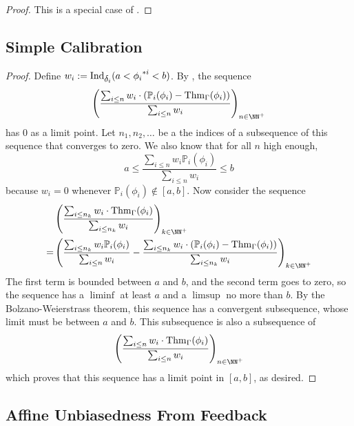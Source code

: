 \documentclass[authordate,onecolumn,noenvironments]{miri-tech-article}
\numberwithin{equation}{subsection}
\newcommand{\nn}{n}
\newcommand{\fuz}{w}
\newcommand{\BelState}{\mathbb{P}}
\newcommand{\pf}[2][\nn]{{#2}^{*#1}}
\newcommand{\pt}{\BelState}
\newcommand{\Theory}{\Gamma}
\newcommand{\ctsind}[1]{\operatorname{Ind}_{\text{\small{${#1}$}}}} %
\newcommand{\thmind}[1][\Theory]{\operatorname{Thm}_{#1}\-} %
\begin{document}
\recurringunbiasedness*

\begin{proof}
  This is a special case of .
\end{proof}

\subsection{Simple Calibration}\label{app:simcal}

\simcal*
\begin{proof}
Define $\fuz_i := \ctsind{\delta_i}(a < \pf[i]{\phi_i} < b) $.  By , the sequence
 \[
   \left( \frac
      {\sum_{i\leq \nn}\fuz_i\cdot (\pt_i(\phi_i) - \thmind(\phi_i))}
        {\sum_{i\leq \nn}\fuz_i}
      \right)_{n \in \NN^+}
  \]
  has 0 as a limit point.  Let $n_1, n_2, \ldots$ be a the indices of a subsequence of this sequence that converges to zero.  We also know that for all $n$ high enough,
 \[
      a \leq \frac {\sum_{i\leq \nn}\fuz_i \pt_i(\phi_i)}{\sum_{i\leq \nn}\fuz_i} \leq b
  \]
  because $\fuz_i = 0$ whenever $\pt_i(\phi_i) \not\in [a, b]$. Now consider the sequence
  \begin{align*}
    & \left(\frac
      {\sum_{i\leq \nn_k}\fuz_i\cdot \thmind(\phi_i)}
        {\sum_{i\leq \nn_k}\fuz_i}
      \right)_{k \in \NN^+}
      \\
      = &
        \left(
      \frac {\sum_{i\leq \nn_k}\fuz_i \pt_i(\phi_i)}{\sum_{i\leq \nn}\fuz_i}
      -
      \frac{\sum_{i\leq \nn_k}\fuz_i\cdot (\pt_i(\phi_i) - \thmind(\phi_i))}
        {\sum_{i\leq \nn_k}\fuz_i}
      \right)_{k \in \NN^+}
    \end{align*}
      The first term is bounded between $a$ and $b$, and the second term goes to zero, so the sequence has a
      $\liminf$ at least $a$ and a $\limsup$ no more than $b$.  By the Bolzano-Weierstrass theorem,
      this sequence has a convergent subsequence, whose limit must be between $a$ and $b$.
      This subsequence is also a subsequence of
      \[
      \left(\frac
        {\sum_{i\leq \nn}\fuz_i\cdot \thmind(\phi_i)}
          {\sum_{i\leq \nn}\fuz_i}
        \right)_{n \in \NN^+}
      \]
      which proves that this sequence has a limit point in $[a, b]$, as desired.
\end{proof}


\subsection{Affine Unbiasedness From Feedback}\label{app:wubaff}
\end{document}
